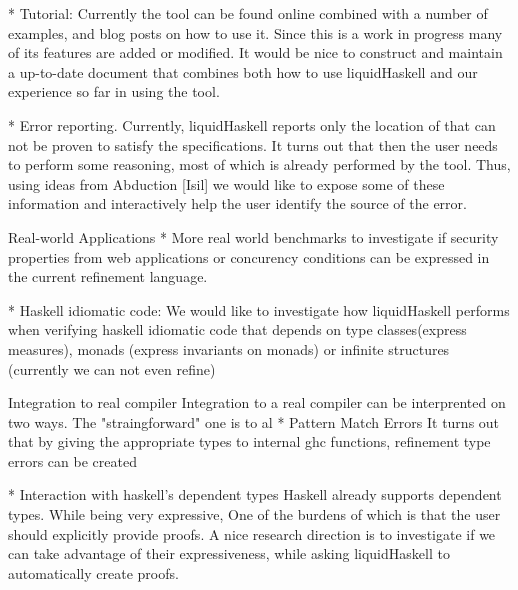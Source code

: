 * Tutorial:
  Currently the tool can be found online combined with a number of examples, 
  and blog posts on how to use it.
  Since this is a work in progress many of its features are added or modified.
  It would be nice to construct and maintain a up-to-date document 
  that combines both how to use liquidHaskell and our experience so far in using the tool. 

* Error reporting.
  Currently, liquidHaskell reports only the location of that can not be proven to satisfy the specifications.
  It turns out that then the user needs to perform some reasoning, most of which is already performed 
  by the tool. Thus, using ideas from Abduction [Isil] we would like to expose some of these information
  and interactively help the user identify the source of the error.


Real-world Applications
* More real world benchmarks to investigate if security properties from web applications
  or concurency conditions can be expressed in the current refinement language.


* Haskell idiomatic code: 
  We would like to investigate how liquidHaskell performs when verifying haskell idiomatic 
  code that depends on type classes(express measures), monads (express invariants on monads)
  or infinite structures (currently we can not even refine) 


Integration to real compiler
 Integration to a real compiler can be interprented on two ways.
 The "straingforward" one is to al 
* Pattern Match Errors
  It turns out that by giving the appropriate types to internal ghc functions, refinement type errors can be created
 

* Interaction with haskell's dependent types
  Haskell already supports dependent types. While being very expressive, One of the burdens of which is that the user should
explicitly provide proofs.
  A nice research direction is to investigate if we can take advantage of their expressiveness, while asking liquidHaskell to
  automatically create proofs.


